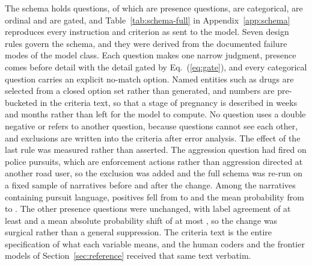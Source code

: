 The schema holds \NQuestions{} questions, of which \NPresence{} are presence questions,
\NChoice{} are categorical, \NScore{} are ordinal and \NGated{} are gated, and
Table~\ref{tab:schema-full} in Appendix~\ref{app:schema} reproduces every instruction and
criterion as sent to the model. Seven design rules govern the schema, and they were derived
from the documented failure modes of the model class. Each question makes one narrow judgment,
presence comes before detail with the detail gated by Eq.~(\ref{eq:gate}), and every
categorical question carries an explicit no-match option. Named entities such as drugs are
selected from a closed option set rather than generated, and numbers are pre-bucketed in the
criteria text, so that a stage of pregnancy is described in weeks and months rather than left
for the model to compute. No question uses a double negative or refers to another question,
because questions cannot see each other, and exclusions are written into the criteria after
error analysis. The effect of the last rule was measured rather than asserted. The aggression
question had fired on police pursuits, which are enforcement actions rather than aggression
directed at another road user, so the exclusion was added and the full schema was re-run on a
fixed sample of \SchemaValidateCompared{} narratives before and after the change. Among the
\PursuitN{} narratives containing pursuit language, positives fell from \PursuitPosBefore{}
to \PursuitPosAfter{} and the mean probability from \PursuitMeanBefore{} to
\PursuitMeanAfter{}. The \OtherNoulsN{} other presence questions were unchanged, with label
agreement of at least \OtherAgreeMin{} and a mean absolute probability shift of at most
\OtherShiftMax{}, so the change was surgical rather than a general suppression. The criteria
text is the entire specification of what each variable means, and the human coders and the
frontier models of Section~\ref{sec:reference} received that same text verbatim.

